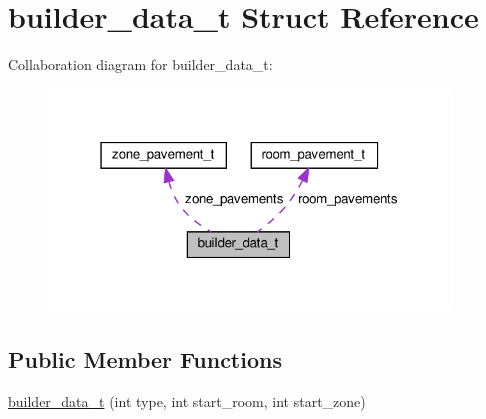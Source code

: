 \hypertarget{structbuilder__data__t}{}\section{builder\+\_\+data\+\_\+t Struct Reference}
\label{structbuilder__data__t}


Collaboration diagram for builder\+\_\+data\+\_\+t\+:
\nopagebreak
\begin{figure}[H]
\begin{center}
\leavevmode
\includegraphics[width=304pt]{structbuilder__data__t__coll__graph}
\end{center}
\end{figure}
\subsection*{Public Member Functions}
\begin{DoxyCompactItemize}
\item 
\hyperlink{structbuilder__data__t_aa081bbc82b8007a5f62b7540822dcba3}{builder\+\_\+data\+\_\+t} (int type, int start\+\_\+room, int start\+\_\+zone)
\end{DoxyCompactItemize}
